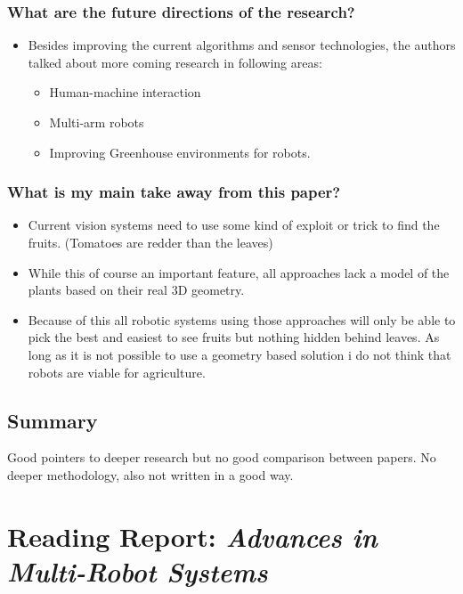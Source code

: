     \subsubsection*{What are the future directions of the research?}
    \begin{itemize}
        \item Besides improving the current algorithms and sensor technologies, the authors talked about more coming research in following areas: \begin{itemize}
            \item Human-machine interaction
            \item Multi-arm robots
            \item Improving Greenhouse environments for robots.
        \end{itemize}
    \end{itemize}
    
    \subsubsection*{What is my main take away from this paper?}
    \begin{itemize}
        \item Current vision systems need to use some kind of exploit or trick to find the fruits. (Tomatoes are redder than the leaves) 
        \item While this of course an important feature, all approaches lack a model of the plants based on their real 3D geometry. 
        \item Because of this all robotic systems using those approaches will only be able to pick the best and easiest to see fruits but nothing hidden behind leaves. As long as it is not possible to use a geometry based solution i do not think that robots are viable for agriculture.
    \end{itemize}
    
    \subsection*{Summary}
    Good pointers to deeper research but no good comparison between papers. No deeper methodology, also not written in a good way.

    \newpage
    
    \section{Reading Report: \emph{Advances in Multi-Robot Systems}}

